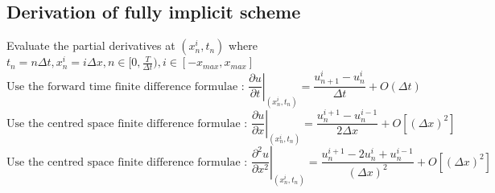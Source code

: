 \subsection{Derivation of fully implicit scheme}
Evaluate the partial derivatives at $(x_{n}^{i}, t_{n})$ where $t_{n} = n\Delta t, x_{n}^{i} = i\Delta x, n \in [0, \frac{T}{\Delta t}), i \in [-x_{max}, x_{max}]$
$$ \text{Use the forward time finite difference formulae : } \left. \frac{\partial u}{\partial t} \right| _{(x_{n}^{i}, t_{n})} = \frac{u_{n+1}^{i} - u_{n}^{i}}{\Delta t} + O(\Delta t)$$
$$ \text{Use the centred space finite difference formulae : } \left. \frac{\partial u}{\partial x} \right| _{(x_{n}^{i}, t_{n})} = \frac{u_{n}^{i+1} - u_{n}^{i-1}}{2\Delta x} + O[(\Delta x)^{2}]$$
$$ \text{Use the centred space finite difference formulae : } \left. \frac{\partial^{2} u}{\partial x^{2}} \right| _{(x_{n}^{i}, t_{n})} = \frac{u_{n}^{i+1} - 2u_{n}^{i} + u_{n}^{i-1}}{(\Delta x)^{2}} + O[(\Delta x)^{2}]$$

